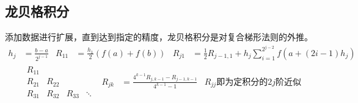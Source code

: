 \documentclass[twocolumn]{article}
\begin{document}
\subsection{龙贝格积分}
添加数据进行扩展，直到达到指定的精度，龙贝格积分是对复合梯形法则的外推。
\begin{align*}
    h_j & =\frac{b-a}{2^{j-1}} & R_{11} & =\frac{h_1}{2}(f(a)+f(b)) & R_{j1} & =\frac{1}{2}R_{j-1,1}+h_j\sum_{i=1}^{2^{j-2}}f(a+(2i-1)h_j)
\end{align*}
\begin{align*}
           & \begin{matrix}
        R_{11} &        &        &        \\
        R_{21} & R_{22} &        &        \\
        R_{31} & R_{32} & R_{33} & \ddots
    \end{matrix}                      &
    R_{jk} & =\frac{4^{k-1}R_{j,k-1}-R_{j-1,k-1}}{4^{k-1}-1} & R_{jj}\text{即为定积分的}2j\text{阶近似}
\end{align*}
\end{document}
